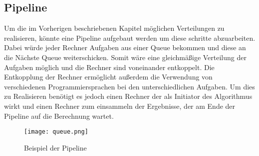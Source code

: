 \subsection{Pipeline}

Um die im Vorherigen beschriebenen Kapitel möglichen Verteilungen zu realisieren, könnte eine Pipeline aufgebaut werden um diese schritte abzuarbeiten. Dabei würde jeder Rechner Aufgaben aus einer Queue bekommen und diese an die Nächste Queue weiterschicken. Somit wäre eine gleichmäßige Verteilung der Aufgaben möglich und die Rechner sind voneinander entkoppelt. Die Entkopplung der Rechner ermöglicht außerdem die Verwendung von verschiedenen Programmiersprachen bei den unterschiedlichen Aufgaben. Um dies zu Realisieren benötigt es jedoch einen Rechner der als Initiator des Algorithmus wirkt und einen Rechner zum einsammeln der Ergebnisse, der am Ende der Pipeline auf die Berechnung wartet.

\begin{figure}[h]
	\centering
	\texttt{[image: queue.png]}
	\caption{Beispiel der Pipeline}
	\label{pipeline}
\end{figure}